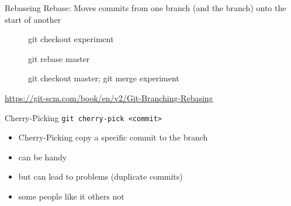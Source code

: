 \begin{frame}[allowframebreaks]{Rebaseing}
	Rebase: Moves commits from one branch (and the branch) onto the start of another
	\begin{figure}
		\centering
		\caption{git checkout experiment}
	\end{figure}

\begin{figure}
	\centering
	\caption{git rebase master}
\end{figure}
\begin{figure}
	\centering
	\caption{git checkout master; git merge experiment}
\end{figure}
\url{https://git-scm.com/book/en/v2/Git-Branching-Rebasing}
	
\end{frame}
\begin{frame}{Cherry-Picking}
	\texttt{git cherry-pick <commit>}
	\begin{itemize}
		\item Cherry-Picking copy a specific commit to the branch
		\item can be handy
		\item but can lead to problems (duplicate commits)
		\item some people like it others not
	\end{itemize}
	
\end{frame}
